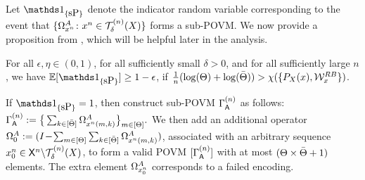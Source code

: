Let $\I_{\{\mbox{sP}\}}$ denote the indicator random variable corresponding to the event that  $\{\Omega_{x^n}^{A} \colon x^n \in  \mathcal{T}_{{\delta}}^{(n)}({X})\}$ forms a  sub-POVM. We now provide a proposition from \cite{winter}, which will be helpful later in the analysis.
\begin{prop} \label{prop:enc_subpovm}For all $\epsilon, \eta \in (0,1)$, for all sufficiently small $\delta > 0$, and for all sufficiently large $n$, we have
$\EE[{\I_{\{\mbox{\normalfont sP}\}}}] \geq 1-\epsilon$, if $\frac{1}{n}(\log(\Theta)+\log(\bar{\Theta})) > \chi(\{P_X(x),\mathcal{W}^{R B}_x\})$.
\end{prop}
If $\I_{\{\mbox{sP}\}} = 1$, then construct sub-POVM $\Gamma^{(n)}_{\mathsf{A}}$ as follows: $\Gamma^{(n)}_{\mathsf{A}} := \big\{\sum_{k\in[\bar{\Theta}]}\Omega_{x^n(m,k)}^{A}\big\}_{m\in[\Theta]}.$ 
We then add an additional operator $\Omega_{0}^A := (I\!-\!\sum_{m\in[\Theta]}\sum_{k\in [\bar{\Theta}]}\Omega_{x^n(m,k)}^A)$, associated with an arbitrary sequence $x^n_0 \in \mathsf{X}^n \backslash\mathcal{T}_{{\delta}}^{(n)}({X})$, to form a valid POVM $[\Gamma^{(n)}_{\mathsf{A}}]$ with at most $(\Theta \times \bar{\Theta}+1)$ elements. The extra element $\Omega_{x^n_0}^A$ corresponds to a failed encoding.

